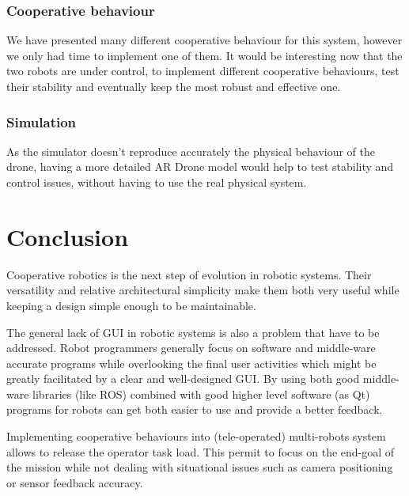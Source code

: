 \documentclass[11pt,a4paper]{article}
\begin{document}
\subsubsection{Cooperative behaviour}
We have presented many different cooperative behaviour for this system, however we only had 
time to implement one of them. It would be interesting now that the two robots are under 
control, to implement
different cooperative behaviours, test their stability and eventually keep the most robust and 
effective
one.

\subsubsection{Simulation}
As the simulator doesn't reproduce accurately the physical behaviour of the drone, having a 
more detailed AR Drone model would help to test stability and control issues, without having 
to use the real physical system.

\clearpage
\section{Conclusion}
Cooperative robotics is the next step of evolution in robotic systems.
Their versatility and relative architectural simplicity make them both very useful while
keeping a design simple enough to be maintainable.

The general lack of GUI in robotic systems is also a problem that have to be addressed. 
Robot programmers generally focus on software and middle-ware accurate programs while 
overlooking the final user activities which might be greatly facilitated by a clear and 
well-designed GUI.
By using both good middle-ware libraries (like ROS) combined with good higher level
software (as Qt) programs for robots can get both easier to use and provide a better 
feedback.

Implementing cooperative behaviours into (tele-operated) multi-robots system allows to release 
the operator task load. This permit to focus on the end-goal of the mission while not dealing 
with situational issues such as camera positioning or sensor feedback accuracy.


\end{document}
